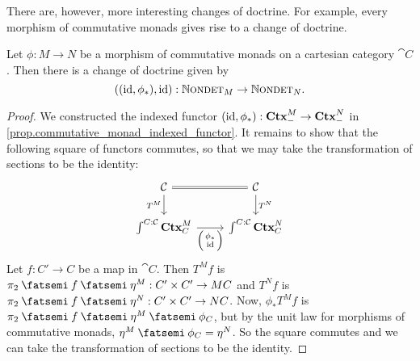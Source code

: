 \documentclass[DynamicalBook]{subfiles}
\begin{document}
There are, however, more interesting changes of doctrine. For example, every
morphism of commutative monads gives rise to a change of doctrine.

\begin{proposition}\label{prop.morphism_commutative_monoid_change_doctrine}
  Let $\phi : M \to N$ be a morphism of commutative monads on a cartesian
  category $\cat{C}$. Then there is a change of doctrine given by
  \[
((\mathrm{id}, \phi_{\ast}), \mathrm{id}) : \mathbb{N}\textsc{ondet}_{M} \to \mathbb{N}\textsc{ondet}_{N}.
  \]
\end{proposition}
\begin{proof}
We constructed the indexed functor $(\mathrm{id}, \phi_{\ast}) : \textbf{Ctx}_{-}^M \to
\textbf{Ctx}_{-}^N$ in \cref{prop.commutative_monad_indexed_functor}. It remains to
show that the following square of functors commutes, so that we may take the
transformation of sections to be the identity:
\[
  \begin{tikzcd}
\cat{C} \ar[r, equals]\ar[d,"T^M"'] & \cat{C}  \ar[d,"T^N"]\\
  \int^{C : \cat{C}}\smctx{C}^M \ar[r, "{\littlelens{\phi_{\ast}}{\id}}"']  & \int^{C : \cat{C}}
  \smctx{C}^N  
  \end{tikzcd}
\]
Let $f : C' \to C$ be a map in $\cat{C}$. Then $T^Mf$ is $\pi_2 \then f \then \eta^M
: C' \times C' \to MC$ and $T^N f$ is $\pi_2 \then f \then \eta^N
: C' \times C' \to NC$. Now, $\phi_{\ast}T^M f$ is $\pi_2 \then f \then \eta^M
\then \phi_C$, but by the unit law for morphisms of commutative monads, $\eta^M
\then \phi_C = \eta^N$. So the square commutes and we can take the
transformation of sections to be the identity.
\end{proof}
  
\end{document}
